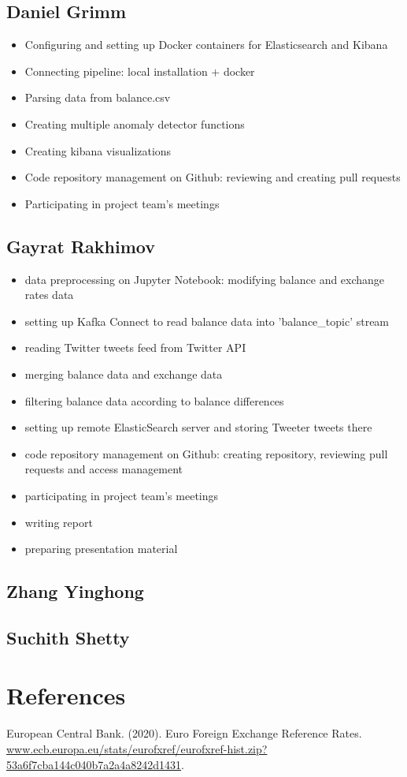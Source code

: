 \documentclass{article}
\begin{document}
\subsection{Daniel Grimm}

\begin{itemize}
    \item Configuring and setting up Docker containers for Elasticsearch and Kibana
    \item Connecting pipeline: local installation + docker
    \item Parsing data from balance.csv
    \item Creating multiple anomaly detector functions
    \item Creating kibana visualizations
    \item Code  repository  management  on  Github: reviewing and creating pull requests 
    \item Participating in project team’s meetings
\end{itemize}

\subsection{Gayrat Rakhimov}

\begin{itemize}
    \item data preprocessing on Jupyter Notebook: modifying balance and exchange rates data
    \item setting up Kafka Connect to read balance data into 'balance\_topic' stream
    \item reading Twitter tweets feed from Twitter API
    \item merging balance data and exchange data
    \item filtering balance data according to balance differences
    \item setting up remote ElasticSearch server and storing Tweeter tweets there
    \item code repository management on Github: creating repository, reviewing pull requests and access management
    \item participating in project team's meetings
    \item writing report
    \item preparing presentation material
\end{itemize}

\subsection{Zhang Yinghong}

\subsection{Suchith Shetty}

\section{References}

\begin{thebibliography}{9}

European Central Bank. (2020). Euro Foreign Exchange Reference Rates. \url{www.ecb.europa.eu/stats/eurofxref/eurofxref-hist.zip?53a6f7cba144c040b7a2a4a8242d1431}.

\end{thebibliography}
\end{document}
